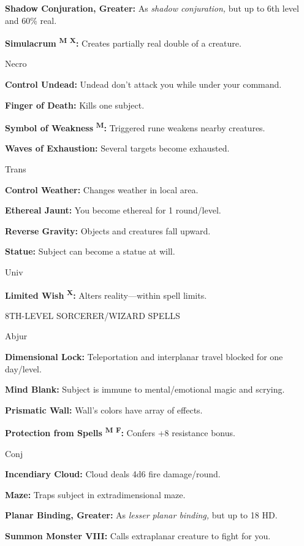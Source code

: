 \documentclass{article}
\begin{document}
\textbf{Shadow Conjuration, Greater:} As \textit{shadow conjuration, }but up to 
6th level and 60\% real.

\textbf{Simulacrum }\textsuperscript{\textbf{M}}{\scriptsize{}\textbf{ }}\textsuperscript{\textbf{X}}\textbf{:} 
Creates partially real double of a creature.

Necro

\textbf{Control Undead:} Undead don't attack you while under your command.

\textbf{Finger of Death:} Kills one subject.

\textbf{Symbol of Weakness }\textsuperscript{\textbf{M}}\textbf{:} Triggered rune 
weakens nearby creatures.

\textbf{Waves of Exhaustion:} Several targets become exhausted.

Trans

\textbf{Control Weather:} Changes weather in local area.

\textbf{Ethereal Jaunt:} You become ethereal for 1 round/level.

\textbf{Reverse Gravity:} Objects and creatures fall upward.

\textbf{Statue:} Subject can become a statue at will.

Univ

\textbf{Limited Wish }\textsuperscript{\textbf{X}}\textbf{:} Alters reality---within 
spell limits.

8TH-LEVEL SORCERER/WIZARD SPELLS

Abjur

\textbf{Dimensional Lock:} Teleportation and interplanar travel blocked for one 
day/level.

\textbf{Mind Blank:} Subject is immune to mental/emotional magic and scrying.

\textbf{Prismatic Wall: }Wall's colors have array of effects.

\textbf{Protection from Spells }\textsuperscript{\textbf{M}}{\scriptsize{}\textbf{ 
}}\textsuperscript{\textbf{F}}\textbf{:} Confers +8 resistance bonus.

Conj

\textbf{Incendiary Cloud:} Cloud deals 4d6 fire damage/round.

\textbf{Maze:} Traps subject in extradimensional maze.

\textbf{Planar Binding, Greater:} As \textit{lesser planar binding, }but up to 
18 HD.

\textbf{Summon Monster VIII:} Calls extraplanar creature to fight for you.
\end{document}

